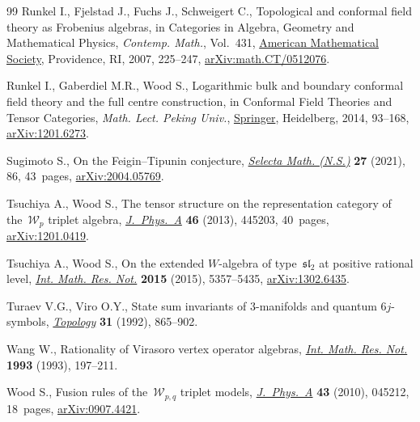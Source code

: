 \documentclass[pdftex]{sigma}
\numberwithin{equation}{section}
\theoremstyle{definition}
\begin{document}
\begin{thebibliography}{99}
Runkel I., Fjelstad J., Fuchs J., Schweigert C., Topological and conformal
 field theory as {F}robenius algebras, in Categories in {A}lgebra, {G}eometry
 and {M}athematical {P}hysics, \textit{Contemp. Math.}, Vol.~431,
 \href{https://doi.org/10.1090/conm/431/08275}{American Mathematical Society},
 Providence, RI, 2007, 225--247,
 \href{http://arxiv.org/abs/math.CT/0512076}{arXiv:math.CT/0512076}.

Runkel I., Gaberdiel M.R., Wood S., Logarithmic bulk and boundary conformal
 field theory and the full centre construction, in Conformal {F}ield
 {T}heories and {T}ensor {C}ategories, \textit{Math. Lect. Peking Univ.},
 \href{https://doi.org/10.1007/978-3-642-39383-9_4}{Springer}, Heidelberg,
 2014, 93--168, \href{http://arxiv.org/abs/1201.6273}{arXiv:1201.6273}.

Sugimoto S., On the {F}eigin--{T}ipunin conjecture,
 \href{https://doi.org/10.1007/s00029-021-00662-1}{\textit{Selecta Math.
 (N.S.)}} \textbf{27} (2021), 86, 43~pages,
 \href{http://arxiv.org/abs/2004.05769}{arXiv:2004.05769}.

Tsuchiya A., Wood S., The tensor structure on the representation category of
 the~{$\mathcal{W}_p$} triplet algebra,
 \href{https://doi.org/10.1088/1751-8113/46/44/445203}{\textit{J.~Phys.~A}}
 \textbf{46} (2013), 445203, 40~pages,
 \href{http://arxiv.org/abs/1201.0419}{arXiv:1201.0419}.

Tsuchiya A., Wood S., On the extended $W$-algebra of type~$\mathfrak{sl}_2$ at
 positive rational level,
 \href{https://doi.org/10.1093/imrn/rnu090}{\textit{Int. Math. Res. Not.}}
 \textbf{2015} (2015), 5357--5435,
 \href{http://arxiv.org/abs/1302.6435}{arXiv:1302.6435}.

Turaev V.G., Viro O.Y., State sum invariants of {$3$}-manifolds and quantum
 {$6j$}-symbols,
 \href{https://doi.org/10.1016/0040-9383(92)90015-A}{\textit{Topology}}
 \textbf{31} (1992), 865--902.

Wang W., Rationality of {V}irasoro vertex operator algebras,
 \href{https://doi.org/10.1155/S1073792893000212}{\textit{Int. Math. Res.
 Not.}} \textbf{1993} (1993), 197--211.

Wood S., Fusion rules of the~{${\mathcal{W}}_{p,q}$} triplet models,
 \href{https://doi.org/10.1088/1751-8113/43/4/045212}{\textit{J.~Phys.~A}}
 \textbf{43} (2010), 045212, 18~pages,
 \href{http://arxiv.org/abs/0907.4421}{arXiv:0907.4421}.

\end{thebibliography}\LastPageEnding
\end{document}
